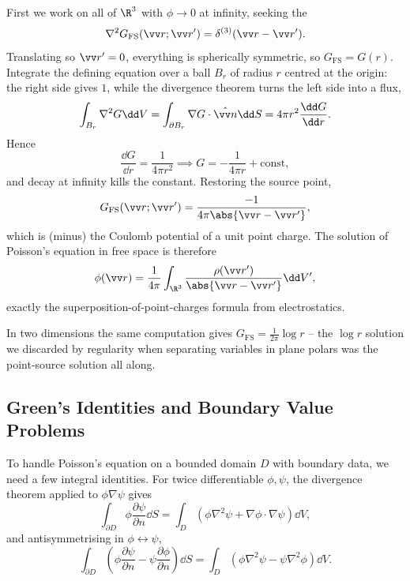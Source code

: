 First we work on all of $\R^3$ with $\phi \to 0$ at infinity, seeking the 
$$
\nabla^2 G_{\text{FS}}(\vv r; \vv r') = \delta^{(3)}(\vv r - \vv r').
$$
Translating so $\vv r' = 0$, everything is spherically symmetric, so $G_{\text{FS}} = G(r)$. Integrate the defining equation over a ball $B_r$ of radius $r$ centred at the origin: the right side gives $1$, while the divergence theorem turns the left side into a flux,
$$
\int_{B_r} \nabla^2 G \dd V = \int_{\partial B_r} \nabla G \cdot \hat{\vv n} \dd S = 4 \pi r^2 \frac{\dd G}{\dd r}.
$$
Hence
$$
\frac{\dd G}{\dd r} = \frac{1}{4 \pi r^2} \implies G = -\frac{1}{4 \pi r} + \text{const},
$$
and decay at infinity kills the constant. Restoring the source point,
$$
G_{\text{FS}}(\vv r; \vv r') = \frac{-1}{4 \pi \abs{\vv r - \vv r'}},
$$
which is (minus) the Coulomb potential of a unit point charge. The solution of Poisson's equation in free space is therefore
$$
\phi(\vv r) = \frac{1}{4\pi} \int_{\R^3} \frac{\rho(\vv r')}{\abs{\vv r - \vv r'}} \dd V',
$$
exactly the superposition-of-point-charges formula from electrostatics.

\begin{remark}
    In two dimensions the same computation gives $G_{\text{FS}} = \frac{1}{2\pi} \log r$ -- the $\log r$ solution we discarded by regularity when separating variables in plane polars was the point-source solution all along.
\end{remark}

\subsection{Green's Identities and Boundary Value Problems}

To handle Poisson's equation on a bounded domain $D$ with boundary data, we need a few integral identities. For twice differentiable $\phi, \psi$, the divergence theorem applied to $\phi \nabla \psi$ gives 
$$
\int_{\partial D} \phi \frac{\partial \psi}{\partial n} \dd S = \int_D \left(\phi \nabla^2 \psi + \nabla \phi \cdot \nabla \psi \right) \dd V,
$$
and antisymmetrising in $\phi \leftrightarrow \psi$, 
$$
\int_{\partial D} \left(\phi \frac{\partial \psi}{\partial n} - \psi \frac{\partial \phi}{\partial n}\right) \dd S = \int_D \left(\phi \nabla^2 \psi - \psi \nabla^2 \phi\right) \dd V.
$$

